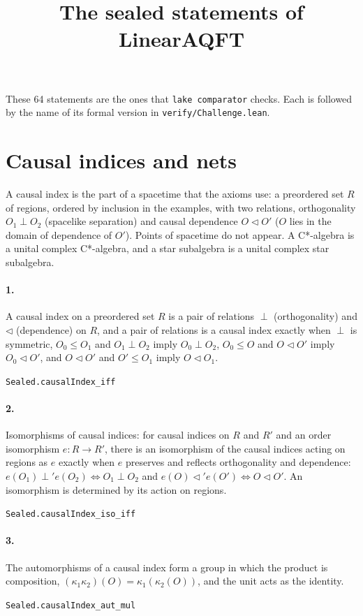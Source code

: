\documentclass[11pt]{article}
\title{The sealed statements of LinearAQFT}\date{}
\begin{document}
\maketitle
These 64 statements are the ones that \texttt{lake comparator} checks. Each is followed by the name of its formal version in \texttt{verify/Challenge.lean}.

\section*{Causal indices and nets}
A causal index is the part of a spacetime that the axioms use: a preordered set $R$ of regions, ordered by inclusion in the examples, with two relations, orthogonality $O_1 \perp O_2$ (spacelike separation) and causal dependence $O \triangleleft O'$ ($O$ lies in the domain of dependence of $O'$). Points of spacetime do not appear. A C*-algebra is a unital complex C*-algebra, and a star subalgebra is a unital complex star subalgebra.

\paragraph{1.} A causal index on a preordered set $R$ is a pair of relations $\perp$ (orthogonality) and $\triangleleft$ (dependence) on $R$, and a pair of relations is a causal index exactly when $\perp$ is symmetric, $O_0 \le O_1$ and $O_1 \perp O_2$ imply $O_0 \perp O_2$, $O_0 \le O$ and $O \triangleleft O'$ imply $O_0 \triangleleft O'$, and $O \triangleleft O'$ and $O' \le O_1$ imply $O \triangleleft O_1$.\par{\footnotesize\texttt{Sealed.causalIndex\_iff}}

\paragraph{2.} Isomorphisms of causal indices: for causal indices on $R$ and $R'$ and an order isomorphism $e : R \to R'$, there is an isomorphism of the causal indices acting on regions as $e$ exactly when $e$ preserves and reflects orthogonality and dependence: $e(O_1) \perp' e(O_2) \iff O_1 \perp O_2$ and $e(O) \triangleleft' e(O') \iff O \triangleleft O'$. An isomorphism is determined by its action on regions.\par{\footnotesize\texttt{Sealed.causalIndex\_iso\_iff}}

\paragraph{3.} The automorphisms of a causal index form a group in which the product is composition, $(\kappa_1 \kappa_2)(O) = \kappa_1(\kappa_2(O))$, and the unit acts as the identity.\par{\footnotesize\texttt{Sealed.causalIndex\_aut\_mul}}
\end{document}
